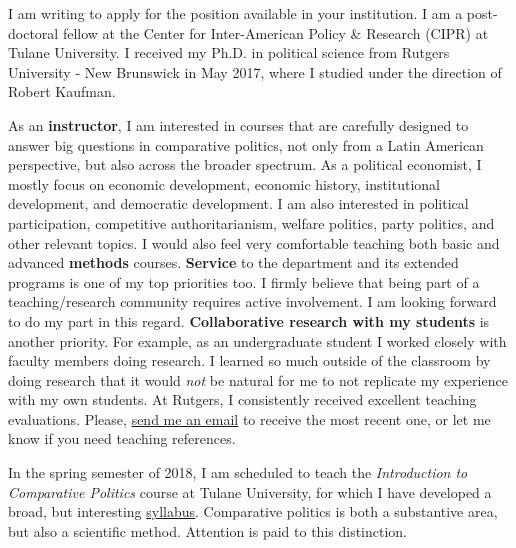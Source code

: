 \documentclass[10pt,stdletter,dateno,sigleft]{newlfm} %
\begin{document}
\begin{newlfm}


\vspace{-0.3cm}I am writing to apply for the position available in your institution. I am a post-doctoral fellow at the Center for Inter-American Policy \& Research (CIPR) at Tulane University. I received my Ph.D. in political science from Rutgers University - New Brunswick in May 2017, where I studied under the direction of Robert Kaufman.


As an {\bf instructor}, I am interested in courses that are carefully designed to answer big questions in comparative politics, not only from a Latin American perspective, but also across the broader spectrum. As a political economist, I mostly focus on economic development, economic history, institutional development, and democratic development. I am also interested in political participation, competitive authoritarianism, welfare politics, party politics, and other relevant topics. I would also feel very comfortable teaching both basic and advanced {\bf methods} courses. {\bf Service} to the department and its extended programs is one of my top priorities too. I firmly believe that being part of a teaching/research community requires active involvement. I am looking forward to do my part in this regard. {\bf Collaborative research with my students} is another priority. For example, as an undergraduate student I worked closely with faculty members doing research. I learned so much outside of the classroom by doing research that it would \emph{not} be natural for me to not replicate my experience with my own students. At Rutgers, I consistently received excellent teaching evaluations. Please, \href{mailto:\filetext}{send me an email} to receive the most recent one, or let me know if you need teaching references.


In the spring semester of 2018, I am scheduled to teach the \emph{Introduction to Comparative Politics} course at Tulane University, for which I have developed a broad, but interesting \href{https://github.com/hbahamonde/Comparative_Politics_UGRAD/raw/master/Bahamonde_Comparative_Politics_Syllabus_UGRAD.pdf}{syllabus}. Comparative politics is both a substantive area, but also a scientific method. Attention is paid to this distinction.


\end{newlfm}
\end{document}
